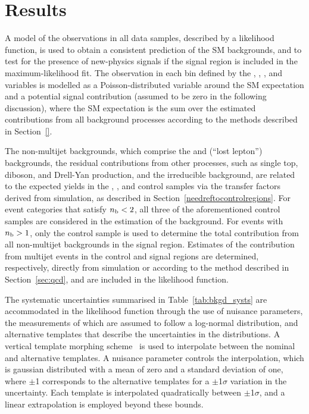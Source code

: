 \section{Results}
\label{sec:result}

A model of the observations in all data samples, described by a
likelihood function, is used to obtain a consistent prediction of the
SM backgrounds, and to test for the presence of new-physics signals if
the signal region is included in the maximum-likelihood fit. The
observation in each bin defined by the \njet, \nb, \scalht, and \HTmiss
variables is modelled as a Poisson-distributed variable around the SM
expectation and a potential signal contribution (assumed to be zero in
the following discussion), where the SM expectation is the sum over
the estimated contributions from all background processes according to
the methods described in Section~\ref{}. 

The non-multijet backgrounds, which comprise the \wlj and \ttj (``lost
lepton'') backgrounds, the residual contributions from other
processes, such as single top, diboson, and Drell-Yan production, and
the irreducible \znunuj background, are related to the expected yields
in the \mj, \mmj, and \gj control samples via the transfer factors
derived from simulation, as described in
Section~\ref{needreftocontrolregions}. For event categories that
satisfy $n_{\text{b}} < 2$, all three of the aforementioned control samples are
considered in the estimation of the \znunuj background. For events
with $n_{\text{b}} > 1$, only the \mj control sample is used to determine the
total contribution from all non-multijet backgrounds in the signal
region. 
Estimates of the contribution from multijet events in the control and
signal regions are determined, respectively, directly from simulation
or according to the method described in Section~\ref{sec:qcd}, and are
included in the likelihood function.


The systematic uncertainties summarised in Table~\ref{tab:bkgd_systs}
are accommodated in the likelihood function through the use of
nuisance parameters, the measurements of which are assumed to follow a
log-normal distribution, and alternative templates that describe the
uncertainties in the \HTmiss distributions. A vertical template morphing
scheme~\cite{Prosper:1306523} is used to interpolate between the
nominal and alternative \HTmiss templates. A nuisance parameter controls
the interpolation, which is gaussian distributed with a mean of zero
and a standard deviation of one, where $\pm$1 corresponds to the
alternative templates for a $\pm$1$\sigma$ variation in the
uncertainty. Each template is interpolated quadratically between
$\pm$1$\sigma$, and a linear extrapolation is employed beyond these
bounds.

